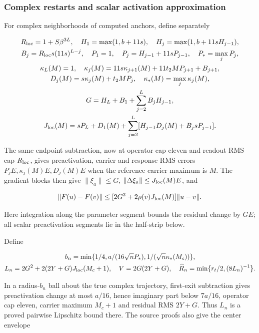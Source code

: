 \subsubsection{Complex restarts and scalar activation approximation}
\label{cp:init:sec:activation}

For complex neighborhoods of computed anchors, define separately

\begin{equation}
\label{cp:init:eq:complex-constants}
\begin{gathered}
R_{\rm loc}=1+S\beta^{3L},\quad
H_1=\max(1,b+11s),\quad H_j=\max(1,b+11sH_{j-1}),\\
B_j=R_{\rm loc}s(11s)^{L-j},\quad
P_1=1,\quad P_j=H_{j-1}+11sP_{j-1},\quad P_*=\max_jP_j,\\
\kappa_L(M)=1,\quad
\kappa_j(M)=11s\kappa_{j+1}(M)+11t_2MP_{j+1}+B_{j+1},\\
D_j(M)=s\kappa_j(M)+t_2MP_j,\quad \kappa_*(M)=\max_j\kappa_j(M),\\
G=H_L+B_1+\sum_{j=2}^LB_jH_{j-1},\\
J_{\rm loc}(M)=sP_L+D_1(M)
  +\sum_{j=2}^L[H_{j-1}D_j(M)+B_jsP_{j-1}].
\end{gathered}
\end{equation}

The same endpoint subtraction, now at operator cap eleven and readout
RMS cap $R_{\rm loc}$, gives preactivation, carrier and response RMS
errors $P_jE,\kappa_j(M)E,D_j(M)E$ when the reference carrier
maximum is $M$. The gradient blocks then give $\|\xi_a\|\le G$,
$\|\Delta\xi_a\|\le J_{\rm loc}(M)E$, and

\[
\|F(u)-F(v)\|\le[2G^2+2\rho(v)J_{\rm loc}(M)]\|u-v\|.
\]

Here integration along the parameter segment bounds the residual change
by $GE$; all scalar preactivation segments lie in the half-strip below.

Define

\begin{equation}
\label{cp:init:eq:restart-radius}
\begin{gathered}
b_n=\min\{1/4,a/(16\sqrt nP_*),1/(\sqrt n\kappa_*(M_c))\},\\
L_n=2G^2+2(2Y+G)J_{\rm loc}(M_c+1),\quad V=2G(2Y+G),\quad
\widehat R_n=\min\{r_t/2,(8L_n)^{-1}\}.
\end{gathered}
\end{equation}

In a radius-$b_n$ ball about the true complex trajectory, first-exit
subtraction gives preactivation change at most $a/16$, hence imaginary
part below $7a/16$, operator cap eleven, carrier maximum $M_c+1$
and residual RMS $2Y+G$. Thus $L_n$ is a proved pairwise Lipschitz
bound there. The source proofs also give the center envelope

